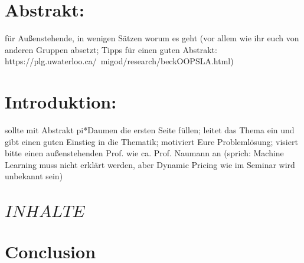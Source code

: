 \documentclass[sigconf]{acmart}
\begin{document}
\section{Abstrakt:} für Außenstehende, in wenigen Sätzen worum es geht (vor allem wie ihr euch von anderen Gruppen absetzt; Tipps für einen guten Abstrakt: https://plg.uwaterloo.ca/~migod/research/beckOOPSLA.html)
\section{Introduktion:} sollte mit Abstrakt pi*Daumen die ersten Seite füllen; leitet das Thema ein und gibt einen guten Einstieg in die Thematik; motiviert Eure Problemlösung; visiert bitte einen außenstehenden Prof. wie ca. Prof. Naumann an (sprich: Machine Learning muss nicht erklärt werden, aber Dynamic Pricing wie im Seminar wird unbekannt sein)
\section{$INHALTE$}
\section{Conclusion}
\end{document}
